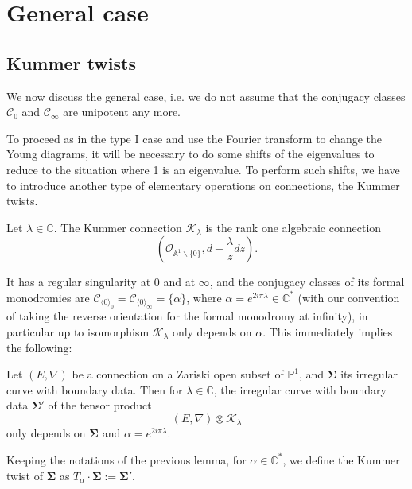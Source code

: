 \documentclass[11pt,a4paper]{amsart}
\numberwithin{equation}{section}
\newcommand{\cir}[1]{\langle #1 \rangle}
\begin{document}
\section{General case}
\label{sec:dualities_general_case}

\subsection{Kummer twists}

We now discuss the general case, i.e. we do not assume that the conjugacy classes $\mathcal C_0$ and $\mathcal C_\infty$ are unipotent any more. 

To proceed as in the type I case and use the Fourier transform to change the Young diagrams, it will be necessary to do some shifts of the eigenvalues to reduce to the situation where 1 is an eigenvalue. To perform such shifts, we have to introduce another type of elementary operations on connections, the Kummer twists.

\begin{definition}
Let $\lambda\in \mathbb C$. The Kummer connection $\mathcal K_\lambda$ is the rank one algebraic connection
\[
\left(\mathcal O_{\mathbb A^1\smallsetminus \{0\}}, d-\frac{\lambda}{z}dz\right).
\]
\end{definition}

It has a regular singularity at $0$ and at $\infty$, and the conjugacy classes of its formal monodromies are $\mathcal C_{\cir{0}_0}=\mathcal C_{\cir{0}_\infty}=\{\alpha\}$, where $\alpha=e^{2i\pi\lambda}\in \mathbb C^*$ (with our convention of taking the reverse orientation for the formal monodromy at infinity), in particular up to isomorphism $\mathcal K_\lambda$ only depends on $\alpha$. This immediately implies the following:

\begin{lemma}
Let $(E,\nabla)$ be a connection on a Zariski open subset of $\mathbb P^1$, and $\bm\Sigma$ its irregular curve with boundary data. Then for $\lambda\in \mathbb C$, the irregular curve with boundary data $\bm\Sigma'$ of the tensor product
\[
(E,\nabla)\otimes \mathcal K_\lambda
\]
only depends on $\bm\Sigma$ and $\alpha=e^{2i\pi\lambda}$.
\end{lemma}

\begin{definition}
Keeping the notations of the previous lemma, for  $\alpha\in \mathbb C^*$, we define the Kummer twist of $\bm\Sigma$ as $T_\alpha\cdot \bm\Sigma:=\bm\Sigma'$.
\end{definition}
\end{document}
